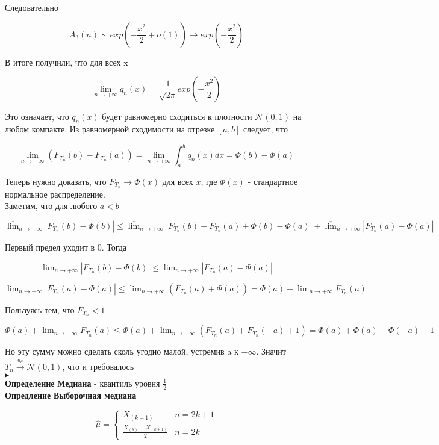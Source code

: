 \documentclass{article}
\begin{document}
Следовательно

$$A_3(n)\sim exp\left(-\frac{x^2}{2} + o(1)\right)\rightarrow exp\left(-\frac{x^2}{2}\right)$$

В итоге получили, что для всех x

$$ \lim_{n\rightarrow+\infty}{q_n(x)} = \frac{1}{\sqrt{2\pi}}exp\left(-\frac{x^2}{2}\right)$$

Это означает, что $q_n(x)$ будет равномерно сходиться к плотности $\mathcal{N}(0,1)$ на любом компакте. Из равномерной сходимости на отрезке $[a, b]$ следует, что

$$ \lim_{n\rightarrow+\infty}{(F_{T_n}(b) - F_{T_n}(a))} = \lim_{n\rightarrow+\infty}\int_a^b{q_n(x)dx} = \Phi(b) - \Phi(a)$$

Теперь нужно доказать, что $F_{T_n}\rightarrow\Phi(x)$ для всех $x$, где $\Phi(x)$ - стандартное нормальное распределение.\\
Заметим, что для любого $a < b$

$$ \overline{\lim}_{n\rightarrow+\infty}|F_{T_n}(b) - \Phi(b)| \leq \overline{\lim}_{n\rightarrow+\infty}|F_{T_n}(b) - F_{T_n}(a) + \Phi(b) - \Phi(a)| + \overline{\lim}_{n\rightarrow+\infty}|F_{T_n}(a)  - \Phi(a)|$$

Первый предел уходит в 0. Тогда

$$ \overline{\lim}_{n\rightarrow+\infty}|F_{T_n}(b) - \Phi(b)| \leq  \overline{\lim}_{n\rightarrow+\infty}|F_{T_n}(a)  - \Phi(a)|$$

$$ \overline{\lim}_{n\rightarrow+\infty}|F_{T_n}(a)  - \Phi(a)|\leq\overline{\lim}_{n\rightarrow+\infty}(F_{T_n}(a) + \Phi(a)) = \Phi(a) + \overline{\lim}_{n\rightarrow+\infty}F_{T_n}(a) $$

Пользуясь тем, что $F_{T_n} < 1$

$$ \Phi(a) + \overline{\lim}_{n\rightarrow+\infty}F_{T_n}(a) \leq \Phi(a) + \overline{\lim}_{n\rightarrow+\infty}(F_{T_n}(a) + F_{T_n}(-a) + 1) = \Phi(a) + \Phi(a) - \Phi(-a) + 1 $$

Но эту сумму можно сделать сколь угодно малой, устремив a к $-\infty$. Значит $T_n\xrightarrow{d_\theta}\mathcal{N}(0,1)$, что и требовалось\\
$\blacktriangleright$\\

\textbf{Определение} \textbf{Медиана} - квантиль уровня $\frac{1}{2}$\\

\textbf{Опредление} \textbf{Выборочная медиана}

\begin{equation*}
\hat{\mu}=
	\begin{cases}
		X_{(k+1)}&n=2k+1\\
		\frac{X_{(k)} + X_{(k+1)}}{2}&n=2k
	\end{cases}
\end{equation*}
\end{document}
